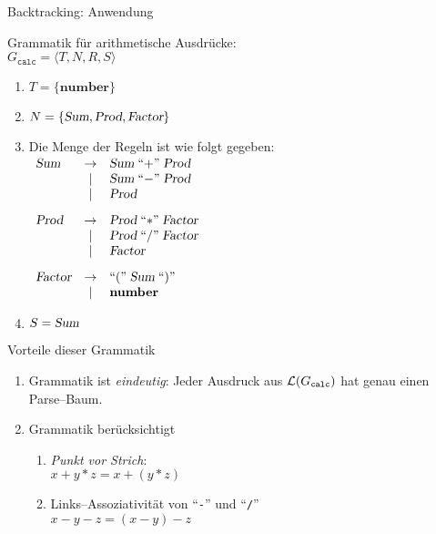 \begin{slide}{}
\normalsize

\begin{center}
Backtracking: Anwendung
\end{center}
\vspace*{0.5cm}

\footnotesize
Grammatik f\"ur arithmetische Ausdr\"ucke: \\[0.3cm]
\hspace*{1.3cm} $G_{\mathtt{calc}} = \langle T, N, R, S \rangle$ 
\begin{enumerate}
\item $T = \{ \mathbf{number} \}$
\item $N = \{ \textsl{Sum}, \textsl{Prod}, \textsl{Factor} \}$
\item Die Menge der Regeln ist wie folgt gegeben: \\[0.3cm]
      \hspace*{1.3cm} $
      \begin{array}{lcl}
         \textsl{Sum}  & \rightarrow & \textsl{Sum}\; ``\mathtt{+}\cq \; \textsl{Prod}    \\
                       & |           & \textsl{Sum}\; ``\mathtt{-}\cq \; \textsl{Prod}    \\
                       & |           & \textsl{Prod}                                      \\[0.3cm]
         \textsl{Prod} & \rightarrow & \textsl{Prod}\; ``\mathtt{*}\cq \; \textsl{Factor} \\
                       & |           & \textsl{Prod}\; ``\mathtt{/}\cq \; \textsl{Factor} \\
                       & |           & \textsl{Factor}                                    \\[0.3cm]
       \textsl{Factor} & \rightarrow & ``\mathtt{(}\cq \;\textsl{Sum}\; ``\mathtt{)}\cq   \\
                       & |           & \mathbf{number}                                    \\
      \end{array}
      $
\item $S = \textsl{Sum}$ 
\end{enumerate}
Vorteile dieser Grammatik
\begin{enumerate}
\item Grammatik ist \emph{eindeutig}: Jeder Ausdruck aus ${\cal L}(G_{\mathtt{calc}})$
      hat genau einen Parse--Baum.
\item Grammatik ber\"ucksichtigt 
      \begin{enumerate}
      \item \emph{Punkt vor Strich}: \\[0.3cm]
             \hspace*{1.3cm} $x+y*z = x + (y*z)$
      \item Links--Assoziativit\"at von ``\texttt{-}'' und ``\texttt{/}'' \\[0.3cm]
            \hspace*{1.3cm} $x - y - z = (x - y) - z$
      \end{enumerate}
\end{enumerate}




\end{slide}
